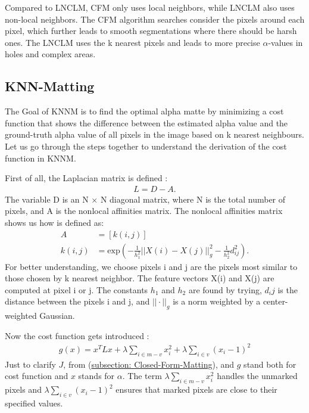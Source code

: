 Compared to LNCLM, CFM only uses local neighbors, while LNCLM also uses non-local neighbors. The CFM algorithm searches consider the pixels around each pixel, which further leads to smooth segmentations where there should be harsh ones. The LNCLM uses the k nearest pixels and leads to more precise $\alpha$-values in holes and complex areas. 




\subsection{KNN-Matting}
The Goal of KNNM is to find the optimal alpha matte by minimizing a cost function that shows the difference between the estimated alpha value and the ground-truth alpha value of all pixels in the image based on k nearest neighbours.
Let us go through the steps together to understand the derivation of the cost function in KNNM.

First of all, the Laplacian matrix is defined \cite{knn}:
\begin{align}
	L = D - A .
\end{align}
The variable D is an N × N diagonal matrix, where N is the total number of pixels, and A is the nonlocal affinities matrix. The nonlocal affinities matrix shows us how \cite{knn} is defined as: 
\begin{align}
	A & = [k(i,j)]\\
	k(i,j) & = \text{exp}(- \frac{1}{h_1^2} || X(i) - X(j) ||^2_g - \frac{1}{h_2^2} d_{ij}^2) .
\end{align}
For better understanding, we choose pixels i and j are the pixels most similar to those chosen by k nearest neighbor. The feature vectors X(i) and X(j) are computed at pixel i or j. The constants \(h_1\) and \(h_2\) are found by trying, \(d_ij\) is the distance between the pixels i and j, and \(|| \cdot ||_g\) is a norm weighted by a center-weighted Gaussian.

Now the cost function gets introduced \cite{knn}:
\begin{align}
	g(x) = x^T L x + \lambda \sum_{i \in m - v} x_i^2 + \lambda \sum_{i \in v} (x_i - 1)^2
\end{align}
Just to clarify \(J\), from (\hyperref[sec:closedform]{subsection: Closed-Form-Matting}), and \(g\) stand both for cost function and \(x\) stands for  \(\alpha\). The term \(\lambda \sum_{i \in m - v} x_i^2\) handles the unmarked pixels and \(\lambda \sum_{i \in v} (x_i - 1)^2\) ensures that marked pixels are close to their specified values. 

